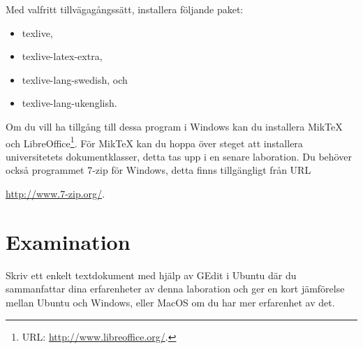 \documentclass[11pt,a4paper]{miunasgn}
\begin{document}
Med valfritt tillvägagångssätt, installera följande paket:
\begin{itemize}
	\item texlive,
	\item texlive-latex-extra,
	\item texlive-lang-swedish, och
	\item texlive-lang-ukenglish.
\end{itemize}

Om du vill ha tillgång till dessa program i Windows kan du installera MikTeX 
\citep{Bosk2012lui} och LibreOffice\footnote{%
	URL: \url{http://www.libreoffice.org/}.
}.
För MikTeX kan du hoppa över steget att installera universitetets 
dokumentklasser, detta tas upp i en senare laboration.
Du behöver också programmet 7-zip för Windows, detta finns tillgängligt från 
URL
\begin{center}
	\url{http://www.7-zip.org/}.
\end{center}


\section{Examination}
\label{sec:Examination}
\noindent
Skriv ett enkelt textdokument med hjälp av GEdit i Ubuntu där du sammanfattar 
dina erfarenheter av denna laboration och ger en kort jämförelse mellan Ubuntu 
och Windows, eller MacOS om du har mer erfarenhet av det.



\end{document}
